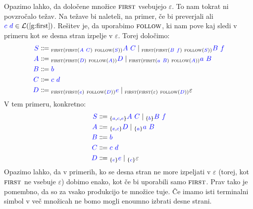\documentclass{article}
\newcommand{\FIRST}{\textsc{first}}
\newcommand{\FOLLOW}{\textsc{follow}}
\newcommand{\Symbol}[1]{\textcolor{blue}{#1}}
\newcommand{\Null}{\varepsilon}
\newcommand{\Language}[1]{\mathcal{L}(#1)}
\newcommand{\MathRef}[1]{\text{\ref{#1}}}
\newcommand{\Arrow}{\Coloneq}
\newcommand{\Seq}{\ }
\newcommand{\Union}{\mathrel{|}}
\newcommand{\Lookahead}[1]{{}_{\{{#1}\}}}
\newcommand{\Lk}[1]{{}_{{#1}}}
\begin{document}
Opazimo lahko, da določene množice $\FIRST$ vsebujejo $\Null$.
To nam tokrat ni povzročalo težav.
Na težave bi naleteli, na primer, če bi preverjali ali $\Symbol{c} \Seq \Symbol{d} \in \Language{\MathRef{g:first}}$.
Rešitev je, da uporabimo $\FOLLOW$, ki nam pove kaj sledi v primeru kot se desna stran izpelje v $\Null$.
Torej določimo:
\begin{equation*}
  \begin{aligned}
    \Symbol{S} &\Arrow \Lk{\FIRST(\FIRST(\Symbol{A} \Seq \Symbol{C}) \Seq \FOLLOW(\Symbol{S}))} \Symbol{A} \Seq \Symbol{C} \Union \Lk{\FIRST(\FIRST(\Symbol{B} \Seq \Symbol{f}) \Seq \FOLLOW(\Symbol{S}))} \Symbol{B} \Seq \Symbol{f} \\
    \Symbol{A} &\Arrow \Lk{\FIRST(\FIRST(\Symbol{D}) \Seq \FOLLOW(\Symbol{A}))} \Symbol{D} \Union \Lk{\FIRST(\FIRST(\Symbol{a} \Seq \Symbol{B}) \Seq \FOLLOW(\Symbol{A}))} \Symbol{a} \Seq \Symbol{B} \\
    \Symbol{B} &\Arrow \Symbol{b}\\
    \Symbol{C} &\Arrow \Symbol{c} \Seq \Symbol{d}\\
    \Symbol{D} &\Arrow \Lk{\FIRST(\FIRST(\Symbol{e}) \Seq \FOLLOW(\Symbol{D}))} \Symbol{e} \Union \Lk{\FIRST(\FIRST(\Null) \Seq \FOLLOW(\Symbol{D}))} \Null
  \end{aligned}
\end{equation*}
V tem primeru, konkretno:
\begin{equation*}
  \begin{aligned}
    \Symbol{S} &\Arrow \Lookahead{\Symbol{a}, \Symbol{c}, \Symbol{e}} \Symbol{A} \Seq \Symbol{C} \Union \Lookahead{\Symbol{b}} \Symbol{B} \Seq \Symbol{f} \\
    \Symbol{A} &\Arrow \Lookahead{\Symbol{e}, \Symbol{c}} \Symbol{D} \Union \Lookahead{\Symbol{a}} \Symbol{a} \Seq \Symbol{B} \\
    \Symbol{B} &\Arrow \Symbol{b}\\
    \Symbol{C} &\Arrow \Symbol{c} \Seq \Symbol{d}\\
    \Symbol{D} &\Arrow \Lookahead{\Symbol{e}} \Symbol{e} \Union \Lookahead{\Symbol{c}} \Null
  \end{aligned}
\end{equation*}
Opazimo lahko, da v primerih, ko se desna stran ne more izpeljati v $\Null$ (torej, kot $\FIRST$ ne vsebuje $\Null$) dobimo enako, kot če bi uporabili samo $\FIRST$.
Prav tako je pomembno, da so za vsako produkcijo te množice tuje.
Če imamo isti terminalni simbol v več množicah ne bomo mogli enoumno izbrati desne strani.
\end{document}
